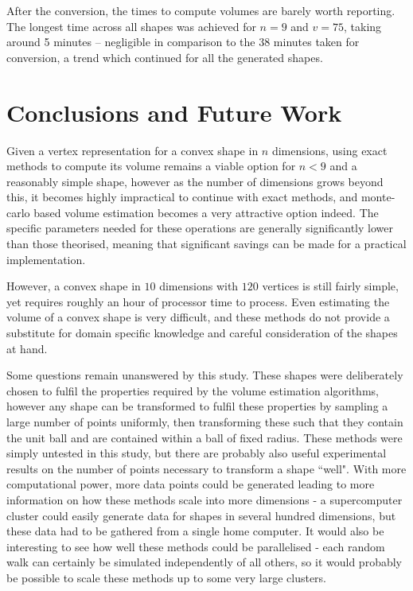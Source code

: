After the conversion, the times to compute volumes are barely worth reporting. The longest time across all shapes was achieved for $n=9$ and $v = 75$, taking around 5 minutes -- negligible in comparison to the 38 minutes taken for conversion, a trend which continued for all the generated shapes.

\section{Conclusions and Future Work}

Given a vertex representation for a convex shape in $n$ dimensions, using exact methods to compute its volume remains a viable option for $n<9$ and a reasonably simple shape, however as the number of dimensions grows beyond this, it becomes highly impractical to continue with exact methods, and monte-carlo based volume estimation becomes a very attractive option indeed. The specific parameters needed for these operations are generally significantly lower than those theorised, meaning that significant savings can be made for a practical implementation.

However, a convex shape in $10$ dimensions with $120$ vertices is still fairly simple, yet requires roughly an hour of processor time to process. Even estimating the volume of a convex shape is very difficult, and these methods do not provide a substitute for domain specific knowledge and careful consideration of the shapes at hand.

Some questions remain unanswered by this study. These shapes were deliberately chosen to fulfil the properties required by the volume estimation algorithms, however any shape can be transformed to fulfil these properties by sampling a large number of points uniformly, then transforming these such that they contain the unit ball and are contained within a ball of fixed radius. These methods were simply untested in this study, but there are probably also useful experimental results on the number of points necessary to transform a shape ``well". With more computational power, more data points could be generated leading to more information on how these methods scale into more dimensions - a supercomputer cluster could easily generate data for shapes in several hundred dimensions, but these data had to be gathered from a single home computer. It would also be interesting to see how well these methods could be parallelised - each random walk can certainly be simulated independently of all others, so it would probably be possible to scale these methods up to some very large clusters.

